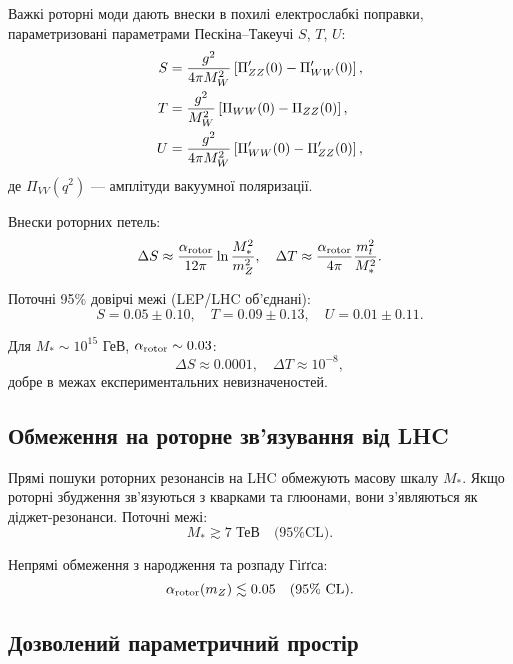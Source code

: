\documentclass[11pt,a4paper]{article}
\numberwithin{equation}{section}
\theoremstyle{plain}
\theoremstyle{definition}
\theoremstyle{remark}
\begin{document}
Важкі роторні моди дають внески в похилі електрослабкі поправки, параметризовані параметрами Пескіна–Такеучі $S$, $T$, $U$:
\begin{align}
S &= \frac{g^2}{4\pi M_W^2}\left[\Pi_{ZZ}'(0) - \Pi_{WW}'(0)\right], \notag\\
T &= \frac{g^2}{M_W^2}\left[\Pi_{WW}(0) - \Pi_{ZZ}(0)\right], \notag\\
U &= \frac{g^2}{4\pi M_W^2}\left[\Pi_{WW}'(0) - \Pi_{ZZ}'(0)\right],
\label{eq:STU}
\end{align}
де $\Pi_{VV}(q^2)$ — амплітуди вакуумної поляризації.

Внески роторних петель:
\begin{equation}
\Delta S \approx \frac{\alpha_{\rm rotor}}{12\pi}\ln\frac{M_*^2}{m_Z^2}, \quad \Delta T \approx \frac{\alpha_{\rm rotor}}{4\pi}\frac{m_t^2}{M_*^2}.
\label{eq:STU-rotor}
\end{equation}

Поточні 95\% довірчі межі (LEP/LHC об'єднані):
\begin{equation}
S = 0{.}05\pm 0{.}10, \quad T = 0{.}09\pm 0{.}13, \quad U = 0{.}01\pm 0{.}11.
\label{eq:STU-exp}
\end{equation}

Для $M_*\sim 10^{15}$ ГеВ, $\alpha_{\rm rotor}\sim 0{.}03$:
\begin{equation}
\Delta S \approx 0{.}0001, \quad \Delta T \approx 10^{-8},
\label{eq:STU-rotor-value}
\end{equation}
добре в межах експериментальних невизначеностей.

\subsection{Обмеження на роторне зв'язування від LHC}

Прямі пошуки роторних резонансів на LHC обмежують масову шкалу $M_*$. Якщо роторні збудження зв'язуються з кварками та глюонами, вони з'являються як діджет-резонанси. Поточні межі:
\begin{equation}
M_* \gtrsim 7\text{ ТеВ} \quad\text{(95\% CL)}.
\label{eq:M-star-LHC}
\end{equation}

Непрямі обмеження з народження та розпаду Гіґґса:
\begin{equation}
\alpha_{\rm rotor}(m_Z) \lesssim 0{.}05 \quad\text{(95\% CL)}.
\label{eq:alpha-LHC}
\end{equation}

\subsection{Дозволений параметричний простір}
\end{document}
